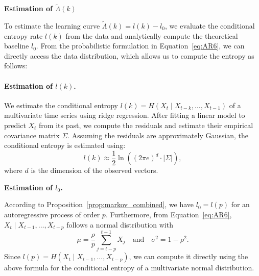 \documentclass{article}
\begin{document}
\textbf{Estimation of $\tilde{\Lambda}(k)$}
\label{sub_section:learning_curve}

To estimate the learning curve $\tilde{\Lambda}(k) = l(k) - l_0$, we evaluate the conditional entropy rate $l(k)$ from the data and analytically compute the theoretical baseline $l_0$. From the probabilistic formulation in Equation~\eqref{eq:AR6}, we can directly access the data distribution, which allows us to compute the entropy as follows:

\paragraph{Estimation of $l(k)$.}  

We estimate the conditional entropy \(l(k) = H(X_t \mid X_{t-k}, \ldots, X_{t-1})\) of a multivariate time series using ridge regression. After fitting a linear model to predict \(X_t\) from its past, we compute the residuals and estimate their empirical covariance matrix \(\Sigma\). Assuming the residuals are approximately Gaussian, the conditional entropy is estimated using:
\[
l(k) \approx \frac{1}{2} \ln\left( (2\pi e)^d \cdot |\Sigma| \right),
\]
where \(d\) is the dimension of the observed vectors. 

\textbf{Estimation of $l_0$.}  

According to Proposition~\ref{prop:markov_combined}, we have $l_0 = l(p)$ for an autoregressive process of order $p$. Furthermore, from Equation~\ref{eq:AR6},  $X_t \mid X_{t-1}, \ldots, X_{t-p}$ follows a normal distribution with 
\[
\mu = \frac{\rho}{p} \sum_{j=t-p}^{t-1} X_j
\quad \text{and} \quad
\sigma^2 = 1 - \rho^2.
\]
Since $l(p) = H(X_t \mid X_{t-1}, \ldots, X_{t-p})$, we can compute it directly using the above formula for the conditional entropy of a multivariate normal distribution.
\end{document}
